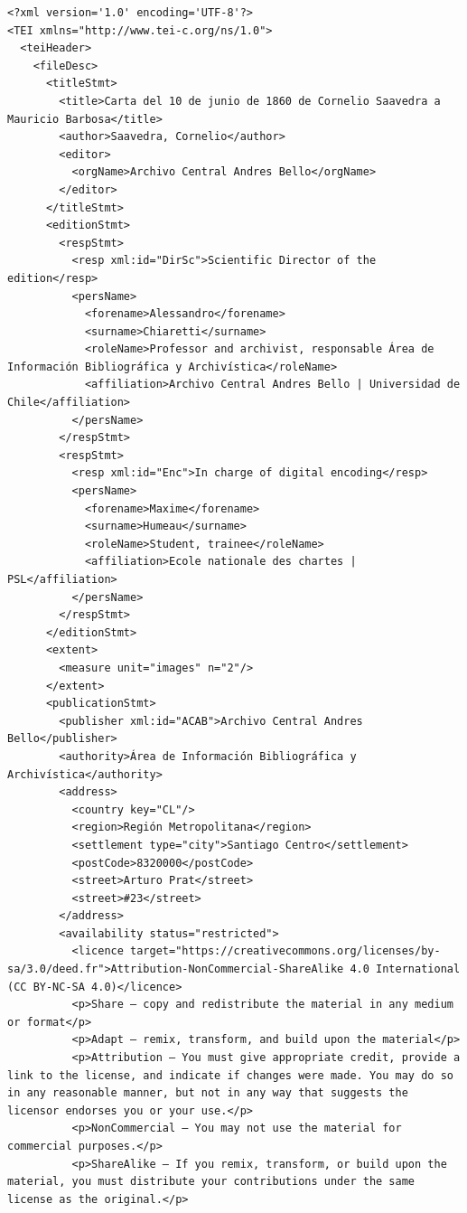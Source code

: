\begin{verbatim}
<?xml version='1.0' encoding='UTF-8'?>
<TEI xmlns="http://www.tei-c.org/ns/1.0">
  <teiHeader>
    <fileDesc>
      <titleStmt>
        <title>Carta del 10 de junio de 1860 de Cornelio Saavedra a Mauricio Barbosa</title>
        <author>Saavedra, Cornelio</author>
        <editor>
          <orgName>Archivo Central Andres Bello</orgName>
        </editor>
      </titleStmt>
      <editionStmt>
        <respStmt>
          <resp xml:id="DirSc">Scientific Director of the edition</resp>
          <persName>
            <forename>Alessandro</forename>
            <surname>Chiaretti</surname>
            <roleName>Professor and archivist, responsable Área de Información Bibliográfica y Archivística</roleName>
            <affiliation>Archivo Central Andres Bello | Universidad de Chile</affiliation>
          </persName>
        </respStmt>
        <respStmt>
          <resp xml:id="Enc">In charge of digital encoding</resp>
          <persName>
            <forename>Maxime</forename>
            <surname>Humeau</surname>
            <roleName>Student, trainee</roleName>
            <affiliation>Ecole nationale des chartes | PSL</affiliation>
          </persName>
        </respStmt>
      </editionStmt>
      <extent>
        <measure unit="images" n="2"/>
      </extent>
      <publicationStmt>
        <publisher xml:id="ACAB">Archivo Central Andres Bello</publisher>
        <authority>Área de Información Bibliográfica y Archivística</authority>
        <address>
          <country key="CL"/>
          <region>Región Metropolitana</region>
          <settlement type="city">Santiago Centro</settlement>
          <postCode>8320000</postCode>
          <street>Arturo Prat</street>
          <street>#23</street>
        </address>
        <availability status="restricted">
          <licence target="https://creativecommons.org/licenses/by-sa/3.0/deed.fr">Attribution-NonCommercial-ShareAlike 4.0 International (CC BY-NC-SA 4.0)</licence>
          <p>Share — copy and redistribute the material in any medium or format</p>
          <p>Adapt — remix, transform, and build upon the material</p>
          <p>Attribution — You must give appropriate credit, provide a link to the license, and indicate if changes were made. You may do so in any reasonable manner, but not in any way that suggests the licensor endorses you or your use.</p>
          <p>NonCommercial — You may not use the material for commercial purposes.</p>
          <p>ShareAlike — If you remix, transform, or build upon the material, you must distribute your contributions under the same license as the original.</p>

\end{verbatim}
